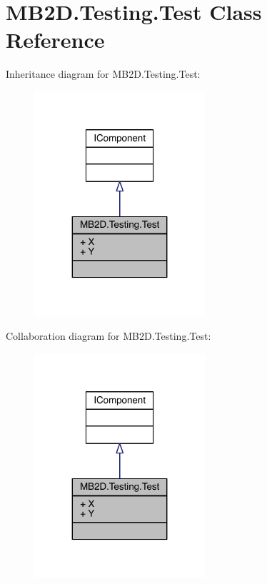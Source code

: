 \hypertarget{class_m_b2_d_1_1_testing_1_1_test}{}\section{M\+B2\+D.\+Testing.\+Test Class Reference}
\label{class_m_b2_d_1_1_testing_1_1_test}


Inheritance diagram for M\+B2\+D.\+Testing.\+Test\+:\nopagebreak
\begin{figure}[H]
\begin{center}
\leavevmode
\includegraphics[width=179pt]{class_m_b2_d_1_1_testing_1_1_test__inherit__graph}
\end{center}
\end{figure}


Collaboration diagram for M\+B2\+D.\+Testing.\+Test\+:\nopagebreak
\begin{figure}[H]
\begin{center}
\leavevmode
\includegraphics[width=179pt]{class_m_b2_d_1_1_testing_1_1_test__coll__graph}
\end{center}
\end{figure}
